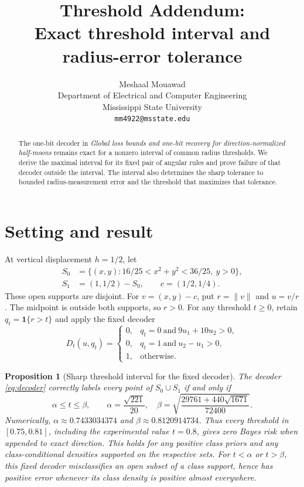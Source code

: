 \documentclass[11pt,a4paper]{article}
\title{Threshold Addendum:\\Exact threshold interval and radius-error tolerance}
\author{Meshaal Mouawad\\Department of Electrical and Computer Engineering\\Mississippi State University\\\texttt{mm4922@msstate.edu}}
\date{}
\newtheorem{proposition}{Proposition}
\numberwithin{equation}{section}
\begin{document}
\maketitle
\begin{abstract}
The one-bit decoder in \emph{Global loss bounds and one-bit recovery for direction-normalized half-moons} remains exact for a nonzero interval of common radius thresholds. We derive the maximal interval for its fixed pair of angular rules and prove failure of that decoder outside the interval. The interval also determines the sharp tolerance to bounded radius-measurement error and the threshold that maximizes that tolerance.
\end{abstract}
\section{Setting and result}
At vertical displacement $h=1/2$, let
\begin{align}
S_0&=\{(x,y):16/25<x^2+y^2<36/25,\ y>0\},\nonumber\\
S_1&=(1,1/2)-S_0,\qquad c=(1/2,1/4).
\end{align}
These open supports are disjoint. For $v=(x,y)-c$, put $r=\|v\|$ and $u=v/r$. The midpoint is outside both supports, so $r>0$. For any threshold $t\geq0$, retain $q_t=\mathbf1\{r>t\}$ and apply the fixed decoder
\begin{equation}
D_t(u,q_t)=
\begin{cases}
0,&q_t=0\ \text{and}\ 9u_1+10u_2>0,\\
0,&q_t=1\ \text{and}\ u_2-u_1>0,\\
1,&\text{otherwise}.
\end{cases}\label{eq:decoder}
\end{equation}
\begin{proposition}[Sharp threshold interval for the fixed decoder]\label{prop:interval}
The decoder \eqref{eq:decoder} correctly labels every point of $S_0\cup S_1$ if and only if
\begin{equation}
\alpha\leq t\leq\beta,\qquad
\alpha=\frac{\sqrt{221}}{20},\quad
\beta=\sqrt{\frac{29761+440\sqrt{1671}}{72400}}.
\label{eq:interval}
\end{equation}
Numerically, $\alpha\approx0.7433034374$ and $\beta\approx0.8120914734$. Thus every threshold in $[0.75,0.81]$, including the experimental value $t=0.8$, gives zero Bayes risk when appended to exact direction. This holds for any positive class priors and any class-conditional densities supported on the respective sets. For $t<\alpha$ or $t>\beta$, this fixed decoder misclassifies an open subset of a class support, hence has positive error whenever its class density is positive almost everywhere.
\end{proposition}
\end{document}
